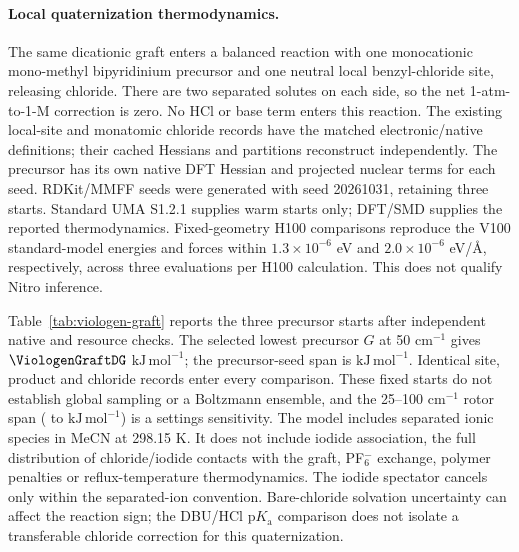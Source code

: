 \documentclass[11pt]{article}
\newcommand{\kj}{\ensuremath{\mathrm{kJ\,mol^{-1}}}}
\begin{document}
\paragraph{Local quaternization thermodynamics.}
The same dicationic graft enters a balanced reaction with one monocationic mono-methyl bipyridinium precursor and one neutral local benzyl-chloride site, releasing chloride. There are two separated solutes on each side, so the net 1-atm-to-1-M correction is zero. No HCl or base term enters this reaction. The existing local-site and monatomic chloride records have the matched electronic/native definitions; their cached Hessians and partitions reconstruct independently. The precursor has its own native DFT Hessian and projected nuclear terms for each seed. RDKit/MMFF seeds were generated with seed 20261031, retaining three starts. Standard UMA S1.2.1 supplies warm starts only; DFT/SMD supplies the reported thermodynamics. Fixed-geometry H100 comparisons reproduce the V100 standard-model energies and forces within $1.3\times10^{-6}$ eV and $2.0\times10^{-6}$ eV/\AA, respectively, across three evaluations per H100 calculation. This does not qualify Nitro inference.

Table~\ref{tab:viologen-graft} reports the three precursor starts after independent native and resource checks. The selected lowest precursor $G$ at 50 cm$^{-1}$ gives $\ViologenGraftDG$ \kj; the precursor-seed span is \ViologenGraftSeedSpan{} \kj. Identical site, product and chloride records enter every comparison. These fixed starts do not establish global sampling or a Boltzmann ensemble, and the 25--100 cm$^{-1}$ rotor span (\ViologenGraftRotorLow{} to \ViologenGraftRotorHigh{} \kj) is a settings sensitivity. The model includes separated ionic species in MeCN at 298.15 K. It does not include iodide association, the full distribution of chloride/iodide contacts with the graft, PF$_6^-$ exchange, polymer penalties or reflux-temperature thermodynamics. The iodide spectator cancels only within the separated-ion convention. Bare-chloride solvation uncertainty can affect the reaction sign; the DBU/HCl p$K_\mathrm a$ comparison does not isolate a transferable chloride correction for this quaternization.

\begin{table}[htbp]\centering
\caption{Three fixed precursor starts for the exact viologen grafting cycle. Relative precursor $G$ and grafting $\Delta G$ are kJ/mol at the 50 cm$^{-1}$ rotor setting; the lowest internal frequency is cm$^{-1}$. The product is the checked dicationic graft.}
\label{tab:viologen-graft}

\end{table}
\end{document}
